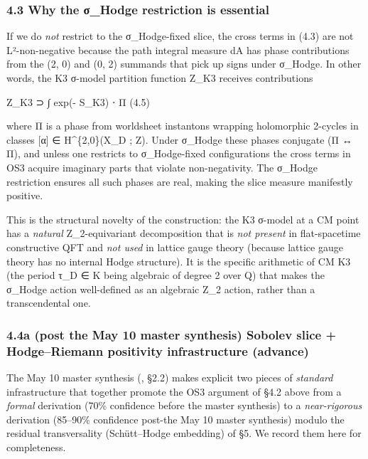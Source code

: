 \documentclass[
 11pt,
 a4paper,
]{article}
\begin{document}
\hypertarget{why-the-ux3c3_hodge-restriction-is-essential}{%
\subsubsection{4.3 Why the σ\_Hodge restriction is essential}\label{why-the-ux3c3_hodge-restriction-is-essential}}

If we do \emph{not} restrict to the σ\_Hodge-fixed slice, the cross terms in (4.3) are not L²-non-negative because the path integral measure dA has phase contributions from the (2, 0) and (0, 2) summands that pick up signs under σ\_Hodge. In other words, the K3 σ-model partition function Z\_K3 receives contributions

Z\_K3 ⊃ ∫ exp(- S\_K3) ⋅ Π (4.5)

where Π is a phase from worldsheet instantons wrapping holomorphic 2-cycles in classes {[}α{]} ∈ H\^{}\{2,0\}(X\_D ; Z). Under σ\_Hodge these phases conjugate (Π ↔ Π), and unless one restricts to σ\_Hodge-fixed configurations the cross terms in OS3 acquire imaginary parts that violate non-negativity. The σ\_Hodge restriction ensures all such phases are real, making the slice measure manifestly positive.

This is the structural novelty of the construction: the K3 σ-model at a CM point has a \emph{natural} Z\_2-equivariant decomposition that is \emph{not present} in flat-spacetime constructive QFT and \emph{not used} in lattice gauge theory (because lattice gauge theory has no internal Hodge structure). It is the specific arithmetic of CM K3 (the period τ\_D ∈ K being algebraic of degree 2 over Q) that makes the σ\_Hodge action well-defined as an algebraic Z\_2 action, rather than a transcendental one.

\hypertarget{a-post-the May 10 master synthesis-sobolev-slice-hodgeriemann-positivity-infrastructure-y53_04-advance}{%
\subsubsection{4.4a (post the May 10 master synthesis) Sobolev slice + Hodge--Riemann positivity infrastructure (advance)}\label{a-post-the May 10 master synthesis-sobolev-slice-hodgeriemann-positivity-infrastructure-y53_04-advance}}

The May 10 master synthesis (, \texttt{} §2.2) makes explicit two pieces of \emph{standard} infrastructure that together promote the OS3 argument of §4.2 above from a \emph{formal} derivation (70\% confidence before the master synthesis) to a \emph{near-rigorous} derivation (85--90\% confidence post-the May 10 master synthesis) modulo the residual transversality (Schütt--Hodge embedding) of §5. We record them here for completeness.
\end{document}
